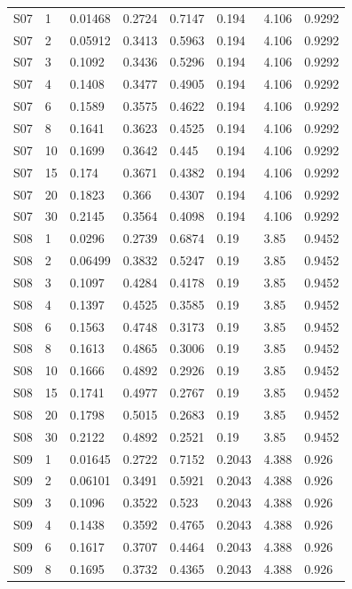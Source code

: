 {\begin{longtable}
{}S07 & 1 & 0.01468 & 0.2724 & 0.7147 & 0.194 & 4.106 & 0.9292\\
{}S07 & 2 & 0.05912 & 0.3413 & 0.5963 & 0.194 & 4.106 & 0.9292\\
{}S07 & 3 & 0.1092 & 0.3436 & 0.5296 & 0.194 & 4.106 & 0.9292\\
{}S07 & 4 & 0.1408 & 0.3477 & 0.4905 & 0.194 & 4.106 & 0.9292\\
{}S07 & 6 & 0.1589 & 0.3575 & 0.4622 & 0.194 & 4.106 & 0.9292\\
{}S07 & 8 & 0.1641 & 0.3623 & 0.4525 & 0.194 & 4.106 & 0.9292\\
{}S07 & 10 & 0.1699 & 0.3642 & 0.445 & 0.194 & 4.106 & 0.9292\\
{}S07 & 15 & 0.174 & 0.3671 & 0.4382 & 0.194 & 4.106 & 0.9292\\
{}S07 & 20 & 0.1823 & 0.366 & 0.4307 & 0.194 & 4.106 & 0.9292\\
{}S07 & 30 & 0.2145 & 0.3564 & 0.4098 & 0.194 & 4.106 & 0.9292\\
{}S08 & 1 & 0.0296 & 0.2739 & 0.6874 & 0.19 & 3.85 & 0.9452\\
{}S08 & 2 & 0.06499 & 0.3832 & 0.5247 & 0.19 & 3.85 & 0.9452\\
{}S08 & 3 & 0.1097 & 0.4284 & 0.4178 & 0.19 & 3.85 & 0.9452\\
{}S08 & 4 & 0.1397 & 0.4525 & 0.3585 & 0.19 & 3.85 & 0.9452\\
{}S08 & 6 & 0.1563 & 0.4748 & 0.3173 & 0.19 & 3.85 & 0.9452\\
{}S08 & 8 & 0.1613 & 0.4865 & 0.3006 & 0.19 & 3.85 & 0.9452\\
{}S08 & 10 & 0.1666 & 0.4892 & 0.2926 & 0.19 & 3.85 & 0.9452\\
{}S08 & 15 & 0.1741 & 0.4977 & 0.2767 & 0.19 & 3.85 & 0.9452\\
{}S08 & 20 & 0.1798 & 0.5015 & 0.2683 & 0.19 & 3.85 & 0.9452\\
{}S08 & 30 & 0.2122 & 0.4892 & 0.2521 & 0.19 & 3.85 & 0.9452\\
{}S09 & 1 & 0.01645 & 0.2722 & 0.7152 & 0.2043 & 4.388 & 0.926\\
{}S09 & 2 & 0.06101 & 0.3491 & 0.5921 & 0.2043 & 4.388 & 0.926\\
{}S09 & 3 & 0.1096 & 0.3522 & 0.523 & 0.2043 & 4.388 & 0.926\\
{}S09 & 4 & 0.1438 & 0.3592 & 0.4765 & 0.2043 & 4.388 & 0.926\\
{}S09 & 6 & 0.1617 & 0.3707 & 0.4464 & 0.2043 & 4.388 & 0.926\\
{}S09 & 8 & 0.1695 & 0.3732 & 0.4365 & 0.2043 & 4.388 & 0.926\\

\end{longtable}}
